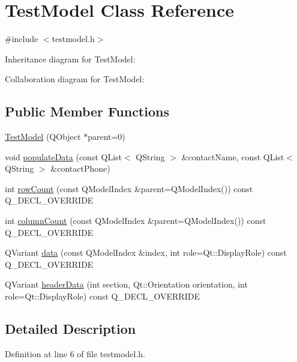 \hypertarget{classTestModel}{}\section{Test\+Model Class Reference}
\label{classTestModel}


{\ttfamily \#include $<$testmodel.\+h$>$}



Inheritance diagram for Test\+Model\+:


Collaboration diagram for Test\+Model\+:
\subsection*{Public Member Functions}
\begin{DoxyCompactItemize}
\item 
\hyperlink{classTestModel_a76c4aeafddf24c022f37cbb91e2655fb}{Test\+Model} (Q\+Object $\ast$parent=0)
\item 
void \hyperlink{classTestModel_aecb04720158cbb7928f0b2aa73ab6750}{populate\+Data} (const Q\+List$<$ Q\+String $>$ \&contact\+Name, const Q\+List$<$ Q\+String $>$ \&contact\+Phone)
\item 
int \hyperlink{classTestModel_a613419652a4b38dddfaeae55b27fb15c}{row\+Count} (const Q\+Model\+Index \&parent=Q\+Model\+Index()) const Q\+\_\+\+D\+E\+C\+L\+\_\+\+O\+V\+E\+R\+R\+I\+DE
\item 
int \hyperlink{classTestModel_a6ba990ae4a449aad0fad4cbb992064c1}{column\+Count} (const Q\+Model\+Index \&parent=Q\+Model\+Index()) const Q\+\_\+\+D\+E\+C\+L\+\_\+\+O\+V\+E\+R\+R\+I\+DE
\item 
Q\+Variant \hyperlink{classTestModel_a02b8ca525772144c6535331e5928055d}{data} (const Q\+Model\+Index \&index, int role=Qt\+::\+Display\+Role) const Q\+\_\+\+D\+E\+C\+L\+\_\+\+O\+V\+E\+R\+R\+I\+DE
\item 
Q\+Variant \hyperlink{classTestModel_a5cee5b1744659ab3e7a9ccd4a7b57bed}{header\+Data} (int section, Qt\+::\+Orientation orientation, int role=Qt\+::\+Display\+Role) const Q\+\_\+\+D\+E\+C\+L\+\_\+\+O\+V\+E\+R\+R\+I\+DE
\end{DoxyCompactItemize}


\subsection{Detailed Description}


Definition at line 6 of file testmodel.\+h.



